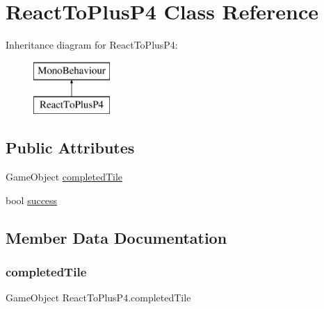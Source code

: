 \hypertarget{class_react_to_plus_p4}{}\section{React\+To\+Plus\+P4 Class Reference}
\label{class_react_to_plus_p4}
Inheritance diagram for React\+To\+Plus\+P4\+:\begin{figure}[H]
\begin{center}
\leavevmode
\includegraphics[height=2.000000cm]{class_react_to_plus_p4}
\end{center}
\end{figure}
\subsection*{Public Attributes}
\begin{DoxyCompactItemize}
\item 
Game\+Object \hyperlink{class_react_to_plus_p4_af8cd8a3a95b4b2498e7ab5f8599285f6}{completed\+Tile}
\item 
bool \hyperlink{class_react_to_plus_p4_aff1b358b1110db15c7f1e00ca724845c}{success}
\end{DoxyCompactItemize}


\subsection{Member Data Documentation}
\mbox{\label{class_react_to_plus_p4_af8cd8a3a95b4b2498e7ab5f8599285f6}} 
\subsubsection{\texorpdfstring{completed\+Tile}{completedTile}}
{\footnotesize\ttfamily Game\+Object React\+To\+Plus\+P4.\+completed\+Tile}

\mbox{\label{class_react_to_plus_p4_aff1b358b1110db15c7f1e00ca724845c}} 
